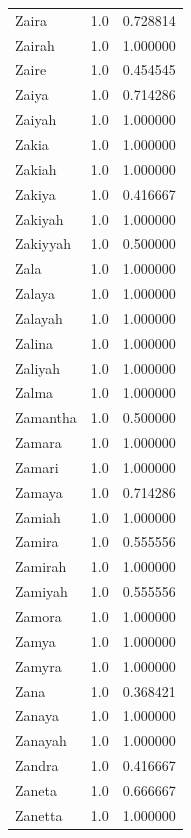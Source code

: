 \documentclass[
  letterpaper,
  DIV=11,
  numbers=noendperiod]{scrreprt}
\begin{document}
\begin{tabular}{lrr}
Zaira           &   1.0 &   0.728814 \\
Zairah          &   1.0 &   1.000000 \\
Zaire           &   1.0 &   0.454545 \\
Zaiya           &   1.0 &   0.714286 \\
Zaiyah          &   1.0 &   1.000000 \\
Zakia           &   1.0 &   1.000000 \\
Zakiah          &   1.0 &   1.000000 \\
Zakiya          &   1.0 &   0.416667 \\
Zakiyah         &   1.0 &   1.000000 \\
Zakiyyah        &   1.0 &   0.500000 \\
Zala            &   1.0 &   1.000000 \\
Zalaya          &   1.0 &   1.000000 \\
Zalayah         &   1.0 &   1.000000 \\
Zalina          &   1.0 &   1.000000 \\
Zaliyah         &   1.0 &   1.000000 \\
Zalma           &   1.0 &   1.000000 \\
Zamantha        &   1.0 &   0.500000 \\
Zamara          &   1.0 &   1.000000 \\
Zamari          &   1.0 &   1.000000 \\
Zamaya          &   1.0 &   0.714286 \\
Zamiah          &   1.0 &   1.000000 \\
Zamira          &   1.0 &   0.555556 \\
Zamirah         &   1.0 &   1.000000 \\
Zamiyah         &   1.0 &   0.555556 \\
Zamora          &   1.0 &   1.000000 \\
Zamya           &   1.0 &   1.000000 \\
Zamyra          &   1.0 &   1.000000 \\
Zana            &   1.0 &   0.368421 \\
Zanaya          &   1.0 &   1.000000 \\
Zanayah         &   1.0 &   1.000000 \\
Zandra          &   1.0 &   0.416667 \\
Zaneta          &   1.0 &   0.666667 \\
Zanetta         &   1.0 &   1.000000 \\

\end{tabular}
\end{document}

